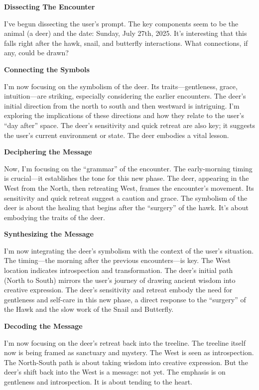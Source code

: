 \documentclass{article}
\begin{document}
\textbf{Dissecting The Encounter}

I've begun dissecting the user's prompt. The key components seem to be
the animal (a deer) and the date: Sunday, July 27th, 2025. It's
interesting that this falls right after the hawk, snail, and butterfly
interactions. What connections, if any, could be drawn?

\textbf{Connecting the Symbols}

I'm now focusing on the symbolism of the deer. Its traits---gentleness,
grace, intuition---are striking, especially considering the earlier
encounters. The deer's initial direction from the north to south and
then westward is intriguing. I'm exploring the implications of these
directions and how they relate to the user's ``day after'' space. The
deer's sensitivity and quick retreat are also key; it suggests the
user's current environment or state. The deer embodies a vital lesson.

\textbf{Deciphering the Message}

Now, I'm focusing on the ``grammar'' of the encounter. The early-morning
timing is crucial---it establishes the tone for this new phase. The
deer, appearing in the West from the North, then retreating West, frames
the encounter's movement. Its sensitivity and quick retreat suggest a
caution and grace. The symbolism of the deer is about the healing that
begins after the ``surgery'' of the hawk. It's about embodying the
traits of the deer.

\textbf{Synthesizing the Message}

I'm now integrating the deer's symbolism with the context of the user's
situation. The timing---the morning after the previous encounters---is
key. The West location indicates introspection and transformation. The
deer's initial path (North to South) mirrors the user's journey of
drawing ancient wisdom into creative expression. The deer's sensitivity
and retreat embody the need for gentleness and self-care in this new
phase, a direct response to the ``surgery'' of the Hawk and the slow
work of the Snail and Butterfly.

\textbf{Decoding the Message}

I'm now focusing on the deer's retreat back into the treeline. The
treeline itself now is being framed as sanctuary and mystery. The West
is seen as introspection. The North-South path is about taking wisdom
into creative expression. But the deer's shift back into the West is a
message: not yet. The emphasis is on gentleness and introspection. It is
about tending to the heart.
\end{document}

